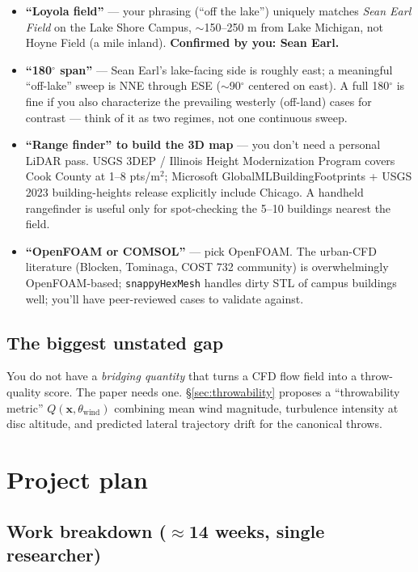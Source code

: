 \begin{itemize}[leftmargin=*,itemsep=2pt]
  \item \textbf{``Loyola field''} --- your phrasing (``off the lake'') uniquely matches \emph{Sean Earl Field} on the Lake Shore Campus, $\sim$150--250 m from Lake Michigan, not Hoyne Field (a mile inland). \textbf{Confirmed by you: Sean Earl.}
  \item \textbf{``180$^\circ$ span''} --- Sean Earl's lake-facing side is roughly east; a meaningful ``off-lake'' sweep is NNE through ESE ($\sim$90$^\circ$ centered on east). A full 180$^\circ$ is fine if you also characterize the prevailing westerly (off-land) cases for contrast --- think of it as two regimes, not one continuous sweep.
  \item \textbf{``Range finder'' to build the 3D map} --- you don't need a personal LiDAR pass. USGS 3DEP / Illinois Height Modernization Program covers Cook County at 1--8 pts/m$^2$; Microsoft GlobalMLBuildingFootprints + USGS 2023 building-heights release explicitly include Chicago. A handheld rangefinder is useful only for spot-checking the 5--10 buildings nearest the field.
  \item \textbf{``OpenFOAM or COMSOL''} --- pick OpenFOAM. The urban-CFD literature (Blocken, Tominaga, COST 732 community) is overwhelmingly OpenFOAM-based; \texttt{snappyHexMesh} handles dirty STL of campus buildings well; you'll have peer-reviewed cases to validate against.
\end{itemize}

\subsection{The biggest unstated gap}

You do not have a \emph{bridging quantity} that turns a CFD flow field into a throw-quality score. The paper needs one. \S\ref{sec:throwability} proposes a ``throwability metric'' $Q(\mathbf{x}, \theta_{\text{wind}})$ combining mean wind magnitude, turbulence intensity at disc altitude, and predicted lateral trajectory drift for the canonical throws.

\section{Project plan}
\label{sec:plan}

\subsection{Work breakdown ($\approx$14 weeks, single researcher)}

